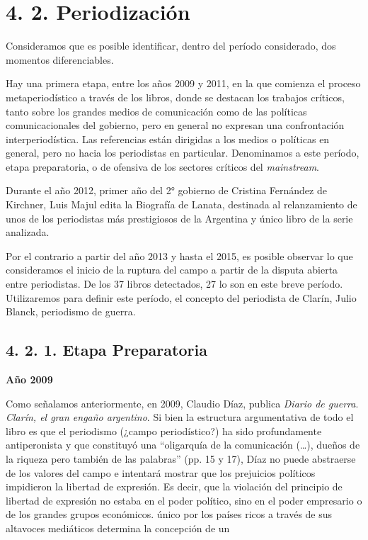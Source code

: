 \section{4. 2. Periodización}

Consideramos que es posible identificar, dentro del período considerado, dos momentos diferenciables.

Hay una primera etapa, entre los años 2009 y 2011, en la que comienza el proceso metaperiodístico a través de los libros, donde se destacan los trabajos críticos, tanto sobre los grandes medios de comunicación como de las políticas comunicacionales del gobierno, pero en general no expresan una confrontación interperiodística. Las referencias están dirigidas a los medios o políticas en general, pero no hacia los periodistas en particular. Denominamos a este período, etapa preparatoria, o de ofensiva de los sectores críticos del \emph{mainstream}.

Durante el año 2012, primer año del 2° gobierno de Cristina Fernández de Kirchner, Luis Majul edita la Biografía de Lanata, destinada al relanzamiento de unos de los periodistas más prestigiosos de la Argentina y único libro de la serie analizada.

Por el contrario a partir del año 2013 y hasta el 2015, es posible observar lo que consideramos el inicio de la ruptura del campo a partir de la disputa abierta entre periodistas. De los 37 libros detectados, 27 lo son en este breve período. Utilizaremos para definir este período, el concepto del periodista de Clarín, Julio Blanck, periodismo de guerra.

\subsection{4. 2. 1. Etapa Preparatoria}

\textbf{Año 2009}

Como señalamos anteriormente, en 2009, Claudio Díaz, publica \emph{Diario de guerra}. \emph{Clarín, el gran engaño argentino}. Si bien la estructura argumentativa de todo el libro es que el periodismo (¿campo periodístico?) ha sido profundamente antiperonista y que constituyó una \enquote{oligarquía de la comunicación (\ldots), dueños de la riqueza pero también de las palabras} (pp. 15 y 17), Díaz no puede abstraerse de los valores del campo e intentará mostrar que los prejuicios políticos impidieron la libertad de expresión. Es decir, que la violación del principio de libertad de expresión no estaba en el poder político, sino en el poder empresario o de los grandes grupos económicos.
único por los países ricos a través de sus altavoces mediáticos determina la concepción de un

